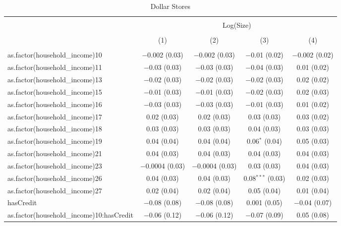
\begin{table}[!htbp] \centering 
  \caption{Dollar Stores} 
  \label{tab:packageSizeDollarLiqAppendix} 
\begin{tabular}{@{\extracolsep{5pt}}lcccc} 
\\[-1.8ex]\hline 
\hline \\[-1.8ex] 
 & \multicolumn{4}{c}{Log(Size)} \\ 
\\[-1.8ex] & (1) & (2) & (3) & (4)\\ 
\hline \\[-1.8ex] 
 as.factor(household\_income)10 & $-$0.002 (0.03) & $-$0.002 (0.03) & $-$0.01 (0.02) & $-$0.002 (0.02) \\ 
  as.factor(household\_income)11 & $-$0.03 (0.03) & $-$0.03 (0.03) & $-$0.04 (0.03) & 0.01 (0.02) \\ 
  as.factor(household\_income)13 & $-$0.02 (0.03) & $-$0.02 (0.03) & $-$0.02 (0.03) & 0.02 (0.02) \\ 
  as.factor(household\_income)15 & $-$0.01 (0.03) & $-$0.01 (0.03) & $-$0.02 (0.03) & 0.02 (0.03) \\ 
  as.factor(household\_income)16 & $-$0.03 (0.03) & $-$0.03 (0.03) & $-$0.01 (0.03) & 0.01 (0.02) \\ 
  as.factor(household\_income)17 & 0.02 (0.03) & 0.02 (0.03) & 0.03 (0.03) & 0.03 (0.02) \\ 
  as.factor(household\_income)18 & 0.03 (0.03) & 0.03 (0.03) & 0.04 (0.03) & 0.03 (0.03) \\ 
  as.factor(household\_income)19 & 0.04 (0.04) & 0.04 (0.04) & 0.06$^{*}$ (0.04) & 0.05 (0.03) \\ 
  as.factor(household\_income)21 & 0.04 (0.03) & 0.04 (0.03) & 0.04 (0.03) & 0.04 (0.03) \\ 
  as.factor(household\_income)23 & $-$0.0004 (0.03) & $-$0.0004 (0.03) & 0.03 (0.03) & 0.04 (0.03) \\ 
  as.factor(household\_income)26 & 0.04 (0.03) & 0.04 (0.03) & 0.08$^{***}$ (0.03) & 0.02 (0.03) \\ 
  as.factor(household\_income)27 & 0.02 (0.04) & 0.02 (0.04) & 0.05 (0.04) & 0.01 (0.04) \\ 
  hasCredit & $-$0.08 (0.08) & $-$0.08 (0.08) & 0.001 (0.05) & $-$0.04 (0.07) \\ 
  as.factor(household\_income)10:hasCredit & $-$0.06 (0.12) & $-$0.06 (0.12) & $-$0.07 (0.09) & 0.05 (0.08) \\ 

\end{tabular}
\end{table}
